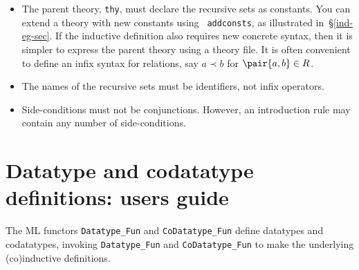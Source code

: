\begin{itemize}
\item The parent theory, {\tt thy}, must declare the recursive sets as
  constants.  You can extend a theory with new constants using {\tt
    addconsts}, as illustrated in~\S\ref{ind-eg-sec}.  If the inductive
  definition also requires new concrete syntax, then it is simpler to
  express the parent theory using a theory file.  It is often convenient to
  define an infix syntax for relations, say $a\prec b$ for $\pair{a,b}\in
  R$.

\item The names of the recursive sets must be identifiers, not infix
operators.  

\item Side-conditions must not be conjunctions.  However, an introduction rule
may contain any number of side-conditions.
\end{itemize}


\section{Datatype and codatatype definitions: users guide}
The ML functors \verb|Datatype_Fun| and \verb|CoDatatype_Fun| define datatypes
and codatatypes, invoking \verb|Datatype_Fun| and
\verb|CoDatatype_Fun| to make the underlying (co)inductive definitions. 


